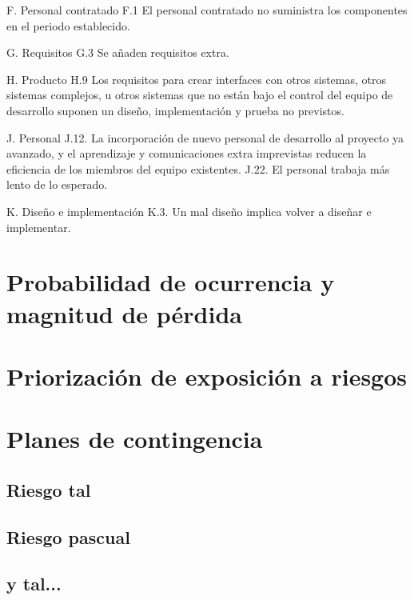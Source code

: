 \documentclass[11pt,a4paper,spanish,twoside]{report}
\begin{document}
F. Personal contratado
F.1 El personal contratado no suministra los componentes en el periodo
establecido.

G. Requisitos
G.3 Se añaden requisitos extra.

H. Producto
H.9 Los requisitos para crear interfaces con otros sistemas, otros sistemas
complejos, u otros sistemas que no están bajo el control del equipo de
desarrollo suponen un diseño, implementación y prueba no previstos.

J. Personal
J.12. La incorporación de nuevo personal de desarrollo al proyecto ya
avanzado, y el aprendizaje y comunicaciones extra imprevistas reducen la
eficiencia de los miembros del equipo existentes.
J.22. El personal trabaja más lento de lo esperado.

K. Diseño e implementación
K.3. Un mal diseño implica volver a diseñar e implementar.

\chapter{Probabilidad de ocurrencia y magnitud de pérdida} 


\chapter{Priorización de exposición a riesgos}

\chapter{Planes de contingencia}
\section{Riesgo tal}

\section{Riesgo pascual}

\section{y tal...}
\end{document}

